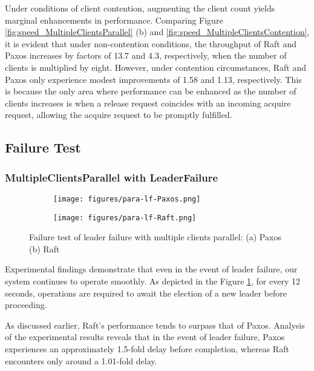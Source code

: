 \documentclass[11pt,a4paper]{article}
\begin{document}
Under conditions of client contention, augmenting the client count yields marginal enhancements in performance. Comparing Figure \ref{fig:speed_MultipleClientsParallel} (b) and \ref{fig:speed_MultipleClientsContention}, it is evident that under non-contention conditions, the throughput of Raft and Paxos increases by factors of 13.7 and 4.3, respectively, when the number of clients is multiplied by eight. However, under contention circumstances, Raft and Paxos only experience modest improvements of 1.58 and 1.13, respectively. This is because the only area where performance can be enhanced as the number of clients increases is when a release request coincides with an incoming acquire request, allowing the acquire request to be promptly fulfilled.

\subsection{Failure Test}
\subsubsection{MultipleClientsParallel with LeaderFailure}

\begin{figure}[!ht]
    \begin{subfigure}{0.49\textwidth}
        \texttt{[image: figures/para-lf-Paxos.png]}
        \caption{}
    \end{subfigure}
    \begin{subfigure}{0.49\textwidth}
        \texttt{[image: figures/para-lf-Raft.png]}
        \caption{}
    \end{subfigure}
    \caption{Failure test of leader failure with multiple clients parallel: (a) Paxos (b) Raft}
    \label{fig:failure_LeaderFailure_MultipleClientsParallel}
\end{figure}

Experimental findings demonstrate that even in the event of leader failure, our system continues to operate smoothly. As depicted in the Figure \ref{fig:failure_LeaderFailure_MultipleClientsParallel}, for every 12 seconds, operations are required to await the election of a new leader before proceeding.

As discussed earlier, Raft's performance tends to surpass that of Paxos. Analysis of the experimental results reveals that in the event of leader failure, Paxos experiences an approximately 1.5-fold delay before completion, whereas Raft encounters only around a 1.01-fold delay.
\end{document}
